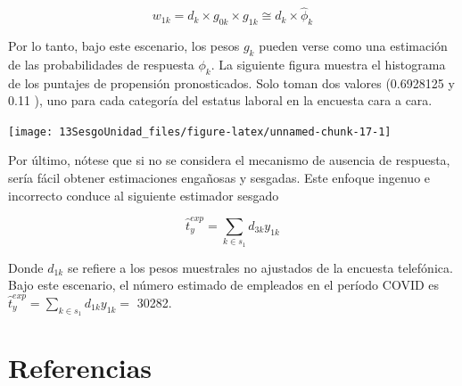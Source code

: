 \documentclass[
  12pt,
]{book}
\begin{document}
\[
w_{1k} = d_k \times g_{0k} \times g_{1k} \cong d_k \times \hat \phi_k
\]

Por lo tanto, bajo este escenario, los pesos \(g_k\) pueden verse como una estimación de las probabilidades de respuesta \(\phi_k\). La siguiente figura muestra el histograma de los puntajes de propensión pronosticados. Solo toman dos valores (0.6928125 y 0.11 ), uno para cada categoría del estatus laboral en la encuesta cara a cara.

\begin{center}\texttt{[image: 13SesgoUnidad\_files/figure-latex/unnamed-chunk-17-1]} \end{center}

Por último, nótese que si no se considera el mecanismo de ausencia de respuesta, sería fácil obtener estimaciones engañosas y sesgadas. Este enfoque ingenuo e incorrecto conduce al siguiente estimador sesgado

\[
\hat{t}_y^{exp}=\sum_{k\in s_1}d_{3k}y_{1k}
\]

Donde \(d_{1k}\) se refiere a los pesos muestrales no ajustados de la encuesta telefónica. Bajo este escenario, el número estimado de empleados en el período COVID es \(\hat{t}_y^{exp}=\sum_{k\in s_1}d_{1k}y_{1k} =\) 30282.

\hypertarget{referencias}{%
\chapter*{Referencias}\label{referencias}}

  
\end{document}
